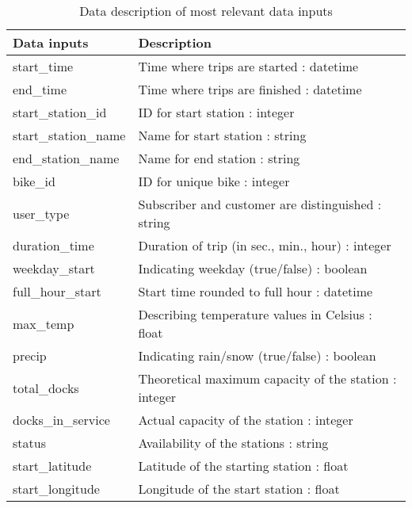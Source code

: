 \begin{table}[H]
\centering
\begin{tabular}{p{}p{}}
\toprule
Data inputs & Description \\
\midrule
start\_time
& 
Time where trips are started : datetime  \\

end\_time
&
Time where trips are finished : datetime \\

start\_station\_id
&
ID for start station : integer   \\

start\_station\_name 
&
Name for start station : string \\

end\_station\_name 
&
Name for end station : string \\

bike\_id 
&
ID for unique bike : integer \\

user\_type 
&
Subscriber and customer are distinguished : string \\

duration\_time 
&
Duration of trip (in sec., min., hour) : integer \\

weekday\_start 
&
Indicating weekday (true/false) : boolean \\

full\_hour\_start 
&
Start time rounded to full hour : datetime \\

max\_temp 
&
Describing temperature values in Celsius : float \\

precip 
&
Indicating rain/snow (true/false) : boolean \\

total\_docks 
&
Theoretical maximum capacity of the station : integer \\

docks\_in\_service 
&
Actual capacity of the station : integer \\

status 
&
Availability of the stations : string \\

start\_latitude 
&
Latitude of the starting station : float \\

start\_longitude 
&
Longitude of the start station : float \\






\bottomrule
\end{tabular}
\caption[Data description of most relevant data inputs]{Data description of most relevant data inputs}
\label{tab:dataDescription}
\end{table} \\